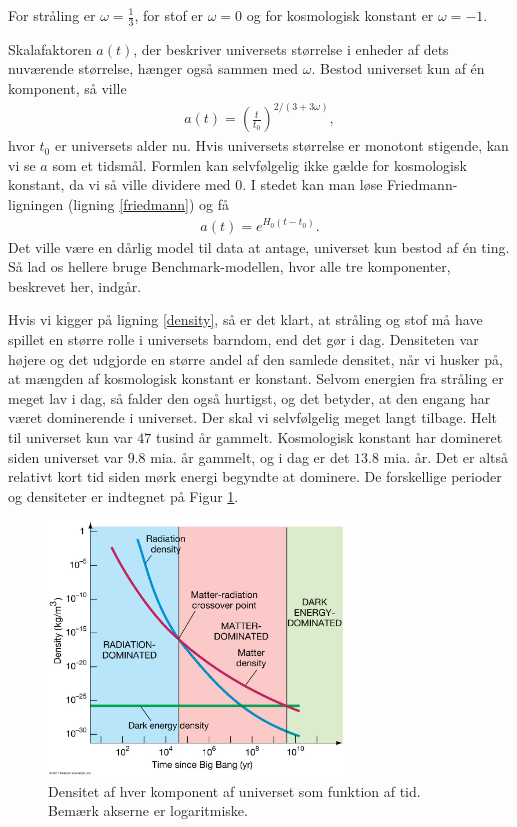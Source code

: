 For stråling er $\omega=\frac{1}{3}$, for stof er $\omega=0$ og for kosmologisk konstant er $\omega=-1$.


Skalafaktoren $a(t)$, der beskriver universets størrelse i enheder af dets nuværende størrelse, hænger også sammen med $\omega$. Bestod universet kun af én komponent, så ville
\begin{align}
a(t)=\left(\frac{t}{t_0}\right)^{2/(3+3\omega)},
\end{align}
hvor $t_0$ er universets alder nu. Hvis universets størrelse er monotont stigende, kan vi se $a$ som et tidsmål. Formlen kan selvfølgelig ikke gælde for kosmologisk konstant, da vi så ville dividere med 0. I stedet kan man løse Friedmann-ligningen (ligning \ref{friedmann}) og få
\begin{align}
	a(t)=e^{H_0(t-t_0)}.
\end{align}
Det ville være en dårlig model til data at antage, universet kun bestod af én ting. Så lad os hellere bruge Benchmark-modellen, hvor alle tre komponenter, beskrevet her, indgår.

Hvis vi kigger på ligning \ref{density}, så er det klart, at stråling og stof må have spillet en større rolle i universets barndom, end det gør i dag. Densiteten var højere og det udgjorde en større andel af den samlede densitet, når vi husker på, at mængden af kosmologisk konstant er konstant. Selvom energien fra stråling er meget lav i dag, så falder den også hurtigst, og det betyder, at den engang har været dominerende i universet. Der skal vi selvfølgelig meget langt tilbage. Helt til universet kun var $47$ tusind år gammelt. Kosmologisk konstant har domineret siden universet var $9.8$ mia. år gammelt, og i dag er det $13.8$ mia. år. Det er altså relativt kort tid siden mørk energi begyndte at dominere. De forskellige perioder og densiteter er indtegnet på Figur \ref{figDensity}.

\begin{figure}[h!]
	\centering
	\includegraphics[width=0.7\textwidth]{Astrofysik/Astrofig/density.jpg}
	\caption{Densitet af hver komponent af universet som funktion af tid. Bemærk akserne er logaritmiske. }
	\label{figDensity}
\end{figure}

